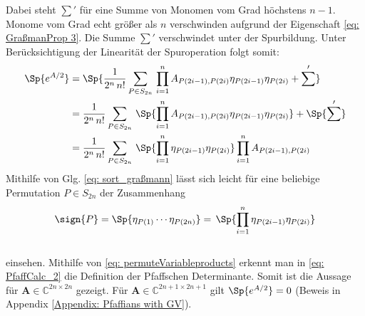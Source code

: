 \noindent Dabei steht $\sum'$ für eine Summe von Monomen vom Grad höchstens $n-1$. Monome vom Grad echt größer als $n$ verschwinden aufgrund der Eigenschaft \eqref{eq: GraßmanProp 3}. Die Summe $\sum'$ verschwindet unter der Spurbildung. Unter Berücksichtigung der Linearität der Spuroperation folgt somit:
\begin{align}
\Sp{e^{A/2}} &= \Sp{\frac{1}{2^n\,n!} \sum_{P \in S_{2n}} \, \prod_{i=1}^n  A_{P(2i-1),P(2i)}\eta_{P(2i-1)}\eta_{P(2i)} + \sum '} \nonumber \\
&= \frac{1}{2^n\,n!} \sum_{P \in S_{2n}} \, \Sp{ \prod_{i=1}^n  A_{P(2i-1),P(2i)}\eta_{P(2i-1)}\eta_{P(2i)}} + \Sp{\sum'} \nonumber \\
&= \frac{1}{2^n\,n!} \sum_{P \in S_{2n}} \, \Sp{ \prod_{i=1}^n \eta_{P(2i-1)}\eta_{P(2i)}} \prod_{i=1}^n A_{P(2i-1),P(2i)}  \label{eq: PfaffCalc_2} 
\end{align}
\noindent Mithilfe von Glg. \eqref{eq: sort_graßmann} lässt sich leicht für eine beliebige Permutation $P \in S_{2n}$ der Zusammenhang
\begin{align} \label{eq: permuteVariableproducts}
\sign{P} = \Sp{\eta_{P(1)} \cdots \eta_{P(2n)}}  = \,\Sp{ \prod_{i=1}^n \eta_{P(2i-1)}\eta_{P(2i)} }
\end{align} \\
\noindent einsehen. Mithilfe von \eqref{eq: permuteVariableproducts} erkennt man in \eqref{eq: PfaffCalc_2} die Definition der Pfaffschen Determinante. Somit ist die Aussage für $\bm{A} \in\mathbb{C}^{2n \times 2n}$ gezeigt. Für $\bm{A} \in\mathbb{C}^{2n+1 \times 2n+1}$ gilt $\Sp{e^{A/2}} = 0$ (Beweis in Appendix \ref{Appendix: Pfaffians with GV}).\\

